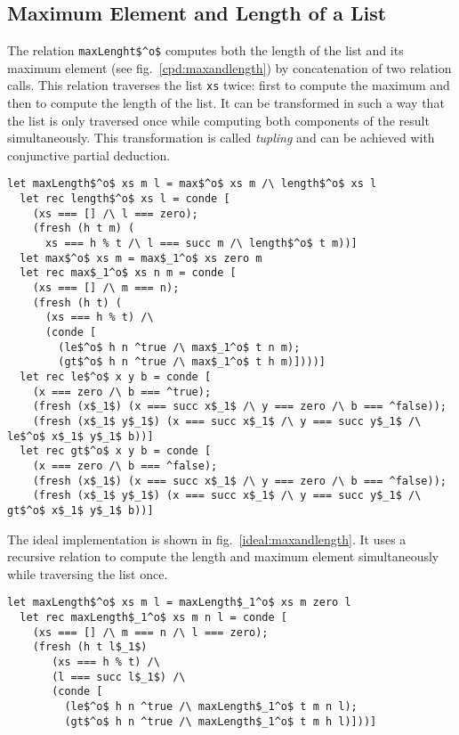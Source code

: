 \subsection{Maximum Element and Length of a List}

The relation \lstinline{maxLenght$^o$} computes both the length of the list and its maximum element (see fig.~\ref{cpd:maxandlength}) by concatenation of two relation calls.
This relation traverses the list \lstinline{xs} twice: first to compute the maximum and then to compute the length of the list.
It can be transformed in such a way that the list is only traversed once while computing both components of the result simultaneously.
This transformation is called \emph{tupling} and can be achieved with conjunctive partial deduction.

\begin{figure*}[!h]
  \centering
  \begin{minipage}{0.85\textwidth}
\begin{lstlisting}[label={cpd:maxandlength}, caption={Maximum element and length of the list}, captionpos=b, frame=tb]
  let maxLength$^o$ xs m l = max$^o$ xs m /\ length$^o$ xs l
  let rec length$^o$ xs l = conde [
    (xs === [] /\ l === zero);
    (fresh (h t m) (
      xs === h % t /\ l === succ m /\ length$^o$ t m))]
  let max$^o$ xs m = max$_1^o$ xs zero m
  let rec max$_1^o$ xs n m = conde [
    (xs === [] /\ m === n);
    (fresh (h t) (
      (xs === h % t) /\
      (conde [
        (le$^o$ h n ^true /\ max$_1^o$ t n m);
        (gt$^o$ h n ^true /\ max$_1^o$ t h m)])))]
  let rec le$^o$ x y b = conde [
    (x === zero /\ b === ^true);
    (fresh (x$_1$) (x === succ x$_1$ /\ y === zero /\ b === ^false));
    (fresh (x$_1$ y$_1$) (x === succ x$_1$ /\ y === succ y$_1$ /\ le$^o$ x$_1$ y$_1$ b))]
  let rec gt$^o$ x y b = conde [
    (x === zero /\ b === ^false);
    (fresh (x$_1$) (x === succ x$_1$ /\ y === zero /\ b === ^false));
    (fresh (x$_1$ y$_1$) (x === succ x$_1$ /\ y === succ y$_1$ /\ gt$^o$ x$_1$ y$_1$ b))]
  \end{lstlisting}
\end{minipage}
\end{figure*}

The ideal implementation is shown in fig.~\ref{ideal:maxandlength}.
It uses a recursive relation to compute the length and maximum element simultaneously while traversing the list once.

\begin{figure*}[!h]
  \centering
  \begin{minipage}{0.7\textwidth}
\begin{lstlisting}[label={ideal:maxandlength}, caption={Ideal implementation of maxlengtho}, captionpos=b, frame=tb]
  let maxLength$^o$ xs m l = maxLength$_1^o$ xs m zero l
  let rec maxLength$_1^o$ xs m n l = conde [
    (xs === [] /\ m === n /\ l === zero);
    (fresh (h t l$_1$)
       (xs === h % t) /\
       (l === succ l$_1$) /\
       (conde [
         (le$^o$ h n ^true /\ maxLength$_1^o$ t m n l);
         (gt$^o$ h n ^true /\ maxLength$_1^o$ t m h l)]))]
  \end{lstlisting}
\end{minipage}
\end{figure*}

